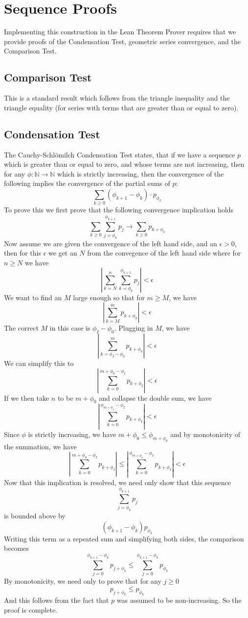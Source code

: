 \documentclass[12pt,reqno]{amsart}
\numberwithin{equation}{section}
\begin{document}
\section{Sequence Proofs}

Implementing this construction in the Lean Theorem Prover requires that we provide proofs of the Condensation Test, geometric series convergence, and the Comparison Test. 

\subsection{Comparison Test}

This is a standard result which follows from the triangle inequality and the triangle equality (for series with terms that are greater than or equal to zero).

\subsection{Condensation Test}

The Cauchy-Schl\"omilch Condensation Test states, that if we have a sequence $p$ which is greater than or equal to zero, and whose terms are not increasing, then for any $\phi : \mathbb{N} \to \mathbb{N}$ which is strictly increasing, then the convergence of the following implies the convergence of the partial sums of $p$:
\[
    \sum_{k\geq 0}(\phi_{k+1} - \phi_k) \cdot p_{\phi_k}
\]
To prove this we first prove that the following convergence implication holds
\[
    \sum_{k\geq 0}\sum_{j=\phi_k}^{\phi_{k+1}}p_j \to \sum_{k\geq 0}p_{k + \phi_0}
\]
Now assume we are given the convergence of the left hand side, and an $\epsilon > 0$, then for this $\epsilon$ we get an $N$ from the convegence of the left hand side where for $n \geq N$ we have
\[
    \left|\sum_{k=N}^n\sum_{k=\phi_k}^{\phi_{k+1}}p_j\right| < \epsilon
\]
We want to find an $M$ large enough so that for $m\geq M$, we have
\[
    \left|\sum_{k=M}^m p_{k+\phi_0}\right| < \epsilon
\]
The correct $M$ in this case is $\phi_I - \phi_0$. Plugging in $M$, we have
\[
    \left|\sum_{k=\phi_I - \phi_0}^m p_{k+\phi_0} \right| < \epsilon
\]
We can simplify this to 
\[
    \left|\sum_{k=0}^{m + \phi_0 - \phi_I}p_{k+\phi_I}\right| < \epsilon
\]
If we then take $n$ to be $m + \phi_0$ and collapse the double sum, we have
\[
    \left|\sum_{k=0}^{\phi_{m+\phi_0} - \phi_I} p_{k+\phi_I} \right| < \epsilon
\]
Since $\phi$ is strictly increasing, we have $m+\phi_0 \leq \phi_{m+\phi_0}$ and by monotonicity of the summation, we have
\[
    \left| \sum_{k=0}^{m+\phi_0 - \phi_I}p_{k+\phi_I}\right| \leq \left|\sum_{k=0}^{\phi_{m+\phi_0} - \phi_I} p_{k+\phi_I}\right| < \epsilon
\]
Now that this implication is resolved, we need only show that this sequence
\[
    \sum_{j=\phi_k}^{\phi_{k+1}}p_j
\]
is bounded above by 
\[
    \left(\phi_{k+1} - \phi_{k}\right) p_{\phi_k}
\]
Writing this term as a repeated sum and simplifying both sides, the comparison becomes
\[
    \sum_{j=0}^{\phi_{k+1} - \phi_k} p_{j + \phi_k} \leq \sum_{j=0}^{\phi_{k+1} - \phi_k}p_{\phi_k}
\]
By monotonicity, we need only to prove that for any $j\geq0$
\[
    p_{j + \phi_k} \leq p_{\phi_k}
\]
And this follows from the fact that $p$ was assumed to be non-increasing. So the proof is complete.
\end{document}
